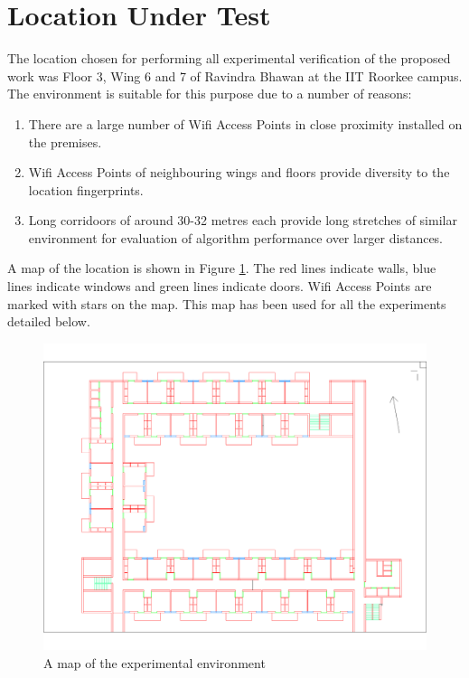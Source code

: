 



\section{Location Under Test}

The location chosen for performing all experimental verification of the
proposed work was Floor 3, Wing 6 and 7 of Ravindra Bhawan at the IIT Roorkee
campus. The environment is suitable for this purpose due to a number of reasons:

\begin{enumerate}
\item There are a large number of Wifi Access Points in close proximity 
    installed on the premises.
\item Wifi Access Points of neighbouring wings and floors provide diversity
    to the location fingerprints.
\item Long corridoors of around 30-32 metres each provide long stretches of
    similar environment for evaluation of algorithm performance over larger
    distances.
\end{enumerate}

A map of the location is shown in Figure \ref{fig:ravindra_map}. The red lines
indicate walls, blue lines indicate windows and green lines indicate doors.
Wifi Access Points are marked with stars on the map. This map has been used
for all the experiments detailed below.

\begin{figure}
    \centering
    \includegraphics[width=5in]{figures/ravindra_map.png}
    \caption{A map of the experimental environment\label{fig:ravindra_map}}
\end{figure}


